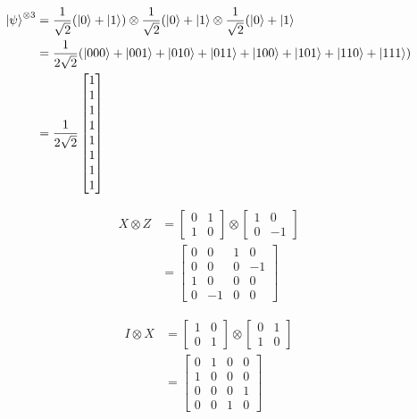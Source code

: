 \begin{align*}
	\ket{\psi}^{\otimes 3} &= \frac{1}{\sqrt{2}} (\ket{0} + \ket{1}) \otimes \frac{1}{\sqrt{2}} (\ket{0} + \ket{1}  \otimes \frac{1}{\sqrt{2}} (\ket{0} + \ket{1}\\
		&= \frac{1}{2\sqrt{2}} (\ket{000}  + \ket{001} + \ket{010} + \ket{011} +  \ket{100}  + \ket{101} + \ket{110} + \ket{111})\\
		&= \frac{1}{2\sqrt{2}} \begin{bmatrix}
			1 \\
			1 \\
			1 \\
			1 \\
			1 \\
			1 \\
			1 \\
			1
		\end{bmatrix}
\end{align*}


\begin{align*}
	X \otimes Z &= \begin{bmatrix}
		0 & 1 \\
		1 & 0
	\end{bmatrix}
	\otimes
	\begin{bmatrix}
		1 & 0 \\
		0 & -1
	\end{bmatrix} \\
	&= \begin{bmatrix}
		0 & 0 & 1 & 0 \\
		0 & 0 & 0 & -1 \\
		1 & 0 & 0 & 0 \\
		0 & -1 & 0 & 0
	\end{bmatrix}
\end{align*}

\begin{align*}
	I \otimes X &= \begin{bmatrix}
		1 & 0 \\
		0 & 1
	\end{bmatrix}
	\otimes
	\begin{bmatrix}
		0 & 1 \\
		1 & 0
	\end{bmatrix}\\
	&=
	\begin{bmatrix}
	0 & 1 & 0 & 0 \\
	1 & 0 & 0 & 0 \\
	0 & 0 & 0 & 1 \\
	0 & 0 & 1 & 0
	\end{bmatrix}
\end{align*}

